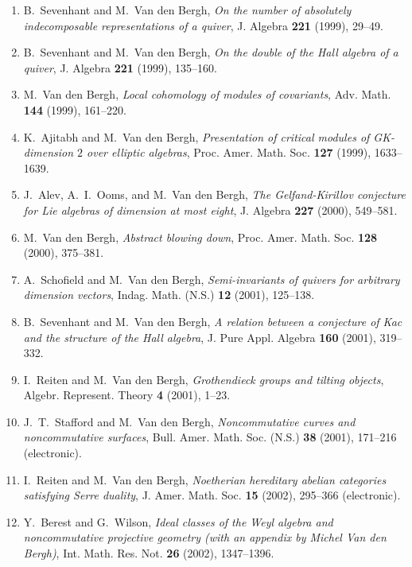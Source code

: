 \begin{enumerate}
\item
B.~Sevenhant and M.~Van den Bergh, {\em On the number of absolutely indecomposable representations of a quiver}, J. Algebra {\bf 221} (1999), 29--49.

\item
B.~Sevenhant and M.~Van den Bergh, {\em On the double of the Hall algebra of a quiver}, J. Algebra {\bf 221} (1999), 135--160.

\item
M.~Van den Bergh, {\em Local cohomology of modules of covariants}, Adv. Math. {\bf 144} (1999), 161--220.

\item
K.~Ajitabh and M.~Van den Bergh, {\em Presentation of critical modules of GK-dimension $2$ over elliptic algebras}, Proc. Amer. Math. Soc. {\bf 127} (1999), 1633--1639.

\item
J.~Alev, A.~I.~Ooms, and M.~Van den Bergh, {\em The Gelfand-Kirillov conjecture for Lie algebras of dimension at most eight}, J. Algebra {\bf 227} (2000), 549--581.

\item
M.~Van den Bergh, {\em Abstract blowing down}, Proc. Amer. Math. Soc. {\bf 128} (2000), 375--381.

\item
A.~Schofield and M.~Van den Bergh, {\em Semi-invariants of quivers for arbitrary dimension vectors}, Indag. Math. (N.S.) {\bf 12} (2001), 125--138.

\item
B.~Sevenhant and M.~Van den Bergh, {\em A relation between a conjecture of Kac and the structure of the Hall algebra}, J. Pure Appl. Algebra {\bf 160} (2001), 319--332.

\item
I.~Reiten and M.~Van den Bergh, {\em Grothendieck groups and tilting objects}, Algebr. Represent. Theory {\bf 4} (2001), 1--23.

\item
J.~T.~Stafford and M.~Van den Bergh, {\em Noncommutative curves and noncommutative surfaces}, Bull. Amer. Math. Soc. (N.S.) {\bf 38} (2001), 171--216 (electronic).

\item
I.~Reiten and M.~Van den Bergh, {\em Noetherian hereditary abelian categories satisfying Serre duality}, J. Amer. Math. Soc. {\bf 15} (2002), 295--366 (electronic).

\item
Y.~Berest and G.~Wilson, {\em Ideal classes of the Weyl algebra and noncommutative projective geometry (with an appendix by Michel Van den Bergh)}, Int. Math. Res. Not. {\bf 26} (2002), 1347--1396.


\end{enumerate}
